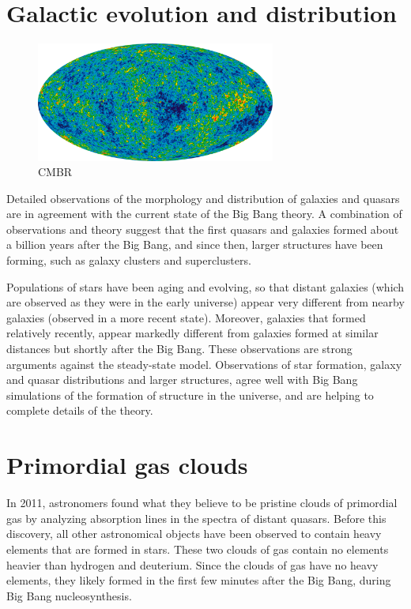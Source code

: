 \documentclass[14pt, oneside]{book}
\begin{document}
		\section{Galactic evolution and distribution}
			\begin{figure}[h]
				\centering
				\includegraphics[width=0.7\textwidth, keepaspectratio]{images/cmbr.png}
				\caption{CMBR}
				\label{fig:cmbr}
			\end{figure}
			Detailed observations of the morphology and distribution of galaxies and quasars are in agreement with the current state of the Big Bang theory. A combination of observations and theory suggest that the first quasars and galaxies formed about a billion years after the Big Bang, and since then, larger structures have been forming, such as galaxy clusters and superclusters.
	
			Populations of stars have been aging and evolving, so that distant galaxies (which are observed as they were in the early universe) appear very different from nearby galaxies (observed in a more recent state). Moreover, galaxies that formed relatively recently, appear markedly different from galaxies formed at similar distances but shortly after the Big Bang. These observations are strong arguments against the steady-state model. Observations of star formation, galaxy and quasar distributions and larger structures, agree well with Big Bang simulations of the formation of structure in the universe, and are helping to complete details of the theory.
			
		\section{Primordial gas clouds}
			In 2011, astronomers found what they believe to be pristine clouds of primordial gas by analyzing absorption lines in the spectra of distant quasars. Before this discovery, all other astronomical objects have been observed to contain heavy elements that are formed in stars. These two clouds of gas contain no elements heavier than hydrogen and deuterium. Since the clouds of gas have no heavy elements, they likely formed in the first few minutes after the Big Bang, during Big Bang nucleosynthesis.
			
\end{document}
